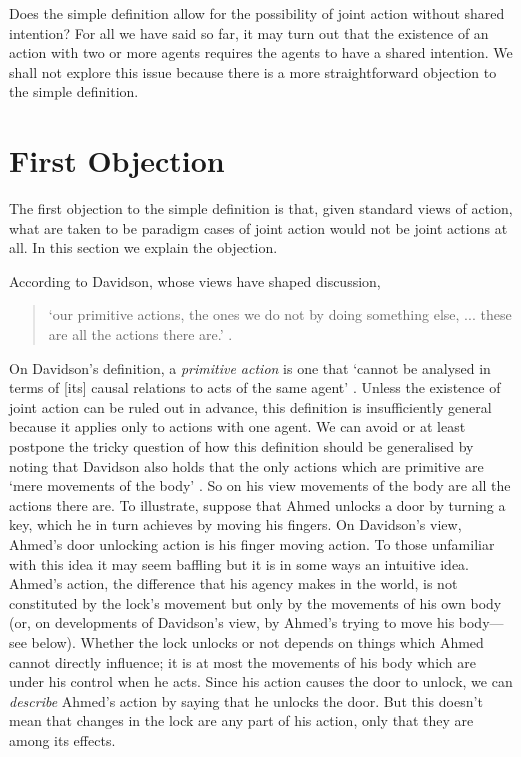 \documentclass[12pt,a4paper]{extarticle}
\begin{document}
Does the simple definition allow for the possibility of joint action without shared intention?
For all we have said so far, it may turn out that the existence of an action with two or more agents requires the agents to have a shared intention.
We shall not explore this issue because there is a more straightforward objection to the simple definition.


\section{First Objection
	\label{section_first_objection}
}

The first objection to the simple definition is that, given standard views of action, what are taken to be paradigm cases of joint action would not be joint actions at all.
In this section we explain the objection.

According to Davidson, whose views have shaped discussion,
%
\begin{quote}
`our primitive actions, the ones we do not by doing something else, ... these are all the actions there are.'
\citep[p.\ 59]{Davidson:1971fz}.
\end{quote}
%
On Davidson's definition, a \emph{primitive action} is one that `cannot be analysed in terms of [its] causal relations to acts of the same agent' \citep[p.\ 49]{Davidson:1971fz}.
Unless the existence of joint action can be ruled out in advance, this definition is insufficiently general because it applies only to actions with one agent.
We can avoid or at least postpone the tricky question of how this definition should be generalised by noting that Davidson also holds that the only actions which are primitive are `mere movements of the body' \citep[p.\ 59]{Davidson:1971fz}.
So on his view movements of the body are all the actions there are.
To illustrate, suppose that Ahmed unlocks a door by turning a key, which he in turn achieves by moving his fingers.
On Davidson's view, Ahmed's door unlocking action is his finger moving action.
To those unfamiliar with this idea it may seem baffling but it is in some ways an intuitive idea.
Ahmed's action, the difference that his agency makes in the world,  is not constituted by the lock's movement but only by the movements of his own body
(or, on developments of Davidson's view, by Ahmed's trying to move his body---see below).
Whether the lock unlocks or not depends on things which Ahmed cannot directly influence; it is at most the movements of his body which are under his control when he acts.
Since his action causes the door to unlock, we can \emph{describe} Ahmed's action by saying that he unlocks the door.  
But this doesn't mean that changes in the lock are any part of his action, only that they are among its effects.
\end{document}

